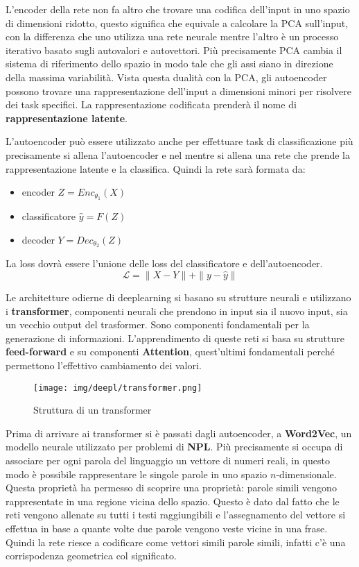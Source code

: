 L'encoder della rete non fa altro che trovare una codifica dell'input in uno spazio
di dimensioni ridotto, questo significa che equivale a calcolare la PCA sull'input,
con la differenza che uno utilizza una rete neurale mentre l'altro è un processo
iterativo basato sugli autovalori e autovettori. Più precisamente PCA cambia il
sistema di riferimento dello spazio in modo tale che gli assi siano in direzione
della massima variabilità. Vista questa dualità con la PCA, gli autoencoder possono
trovare una rappresentazione dell'input a dimensioni minori per risolvere dei task
specifici. La rappresentazione codificata prenderà il nome di \textbf{rappresentazione
      latente}.

L'autoencoder può essere utilizzato anche per effettuare task di classificazione
più precisamente si allena l'autoencoder e nel mentre si allena una rete che prende
la rappresentazione latente e la classifica. Quindi la rete sarà formata da:
\begin{itemize}
      \item encoder $Z = Enc_{\theta_1}(X)$
      \item classificatore $ \hat{y} = F(Z)$
      \item decoder $Y = Dec_{\theta_2}(Z)$
\end{itemize}
La loss dovrà essere l'unione delle loss del classificatore e dell'autoencoder.
\begin{equation}
      \mathcal{L} = \| X - Y \| + \| y - \hat{y} \|
\end{equation}

Le architetture odierne di deeplearning si basano su strutture neurali e utilizzano i
\textbf{transformer}, componenti neurali che prendono in input sia il nuovo input,
sia un vecchio output del trasformer. Sono componenti fondamentali per la generazione
di informazioni. L'apprendimento di queste reti si basa su strutture \textbf{feed-forward}
e su componenti \textbf{Attention}, quest'ultimi fondamentali perché permettono
l'effettivo cambiamento dei valori.
\begin{figure}[!ht]
      \centering
      \texttt{[image: img/deepl/transformer.png]}
      \caption{Struttura di un transformer}
      \label{fig:transformer}
\end{figure}
Prima di arrivare ai transformer si è passati dagli autoencoder, a \textbf{Word2Vec},
un modello neurale utilizzato per problemi di \textbf{NPL}. Più precisamente si occupa
di associare per ogni parola del linguaggio un vettore di numeri reali, in questo
modo è possibile rappresentare le singole parole in uno spazio $n$-dimensionale.
Questa proprietà ha permesso di scoprire una proprietà: parole simili vengono
rappresentate in una regione vicina dello spazio. Questo è dato dal fatto che
le reti vengono allenate su tutti i testi raggiungibili e l'assegnamento del vettore
si effettua in base a quante volte due parole vengono veste vicine in una frase.
Quindi la rete riesce a codificare come vettori simili parole simili, infatti c'è
una corrispodenza geometrica col significato.

